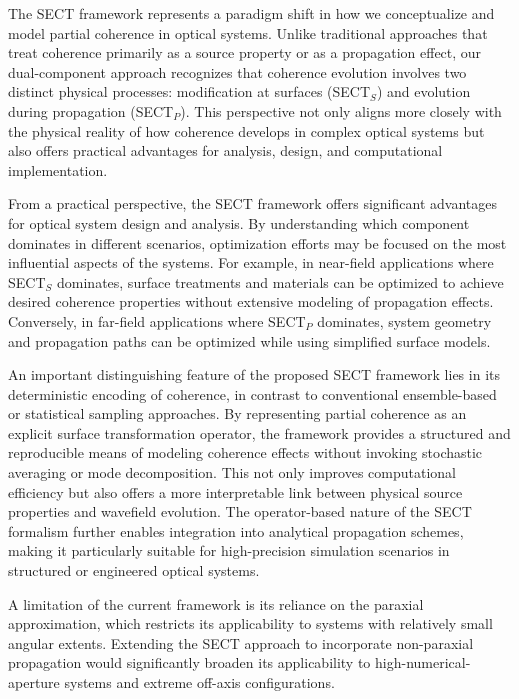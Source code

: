 \documentclass[a4paper,12pt]{article}
\begin{document}
The SECT framework represents a paradigm shift in how we conceptualize and model partial coherence in optical systems. Unlike traditional approaches that treat coherence primarily as a source property or as a propagation effect, our dual-component approach recognizes that coherence evolution involves two distinct physical processes: modification at surfaces (SECT$_S$) and evolution during propagation (SECT$_P$). This perspective not only aligns more closely with the physical reality of how coherence develops in complex optical systems but also offers practical advantages for analysis, design, and computational implementation.

From a practical perspective, the SECT framework offers significant advantages for optical system design and analysis. 
By understanding which component dominates in different scenarios, optimization efforts may be focused on the most 
influential aspects of the systems. For example, in near-field applications where SECT$_S$ dominates, surface 
treatments and materials can be optimized to achieve desired coherence properties without extensive modeling of 
propagation effects. Conversely, in far-field applications where SECT$_P$ dominates, system geometry and propagation 
paths can be optimized while using simplified surface models.

An important distinguishing feature of the proposed SECT framework lies in its deterministic encoding of coherence, in 
contrast to conventional ensemble-based or statistical sampling approaches. By representing partial coherence as an 
explicit surface transformation operator, the framework provides a structured and reproducible means of modeling 
coherence effects without invoking stochastic averaging or mode decomposition. This not only improves computational 
efficiency but also offers a more interpretable link between physical source properties and wavefield evolution. 
The operator-based nature of the SECT formalism further enables integration into analytical propagation schemes, 
making it particularly suitable for high-precision simulation scenarios in structured or engineered optical systems.

A limitation of the current framework is its reliance on the paraxial approximation, which restricts its applicability 
to systems with relatively small angular extents. Extending the SECT approach to incorporate non-paraxial propagation 
would significantly broaden its applicability to high-numerical-aperture systems and extreme off-axis configurations.
\end{document}
